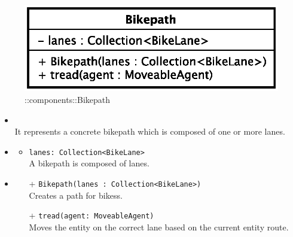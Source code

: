 \begin{figure}[h]
\centering
\includegraphics[scale=0.6,keepaspectratio]{images/solution/app/backend/bikepath.eps}
\caption{\pReactiveComponent::components::Bikepath}
\label{fig:sd-app-bikepath}
\end{figure}
\FloatBarrier
\begin{itemize}
  \item \textbf{\descr} \\
    It represents a concrete bikepath which is composed of one or more lanes.
  \item \textbf{\attrs}
  \begin{itemize}
    \item \texttt{lanes: Collection<BikeLane>} \\
A bikepath is composed of lanes.
  \end{itemize}
  \item \textbf{\ops}
  \begin{itemize}
  \item[+] \texttt{Bikepath(lanes : Collection<BikeLane>)} \\
    Creates a path for bikess.
    \item[+] \texttt{tread(agent: MoveableAgent)} \\
Moves the entity on the correct lane based on the current entity route. 
  \end{itemize}
\end{itemize}
